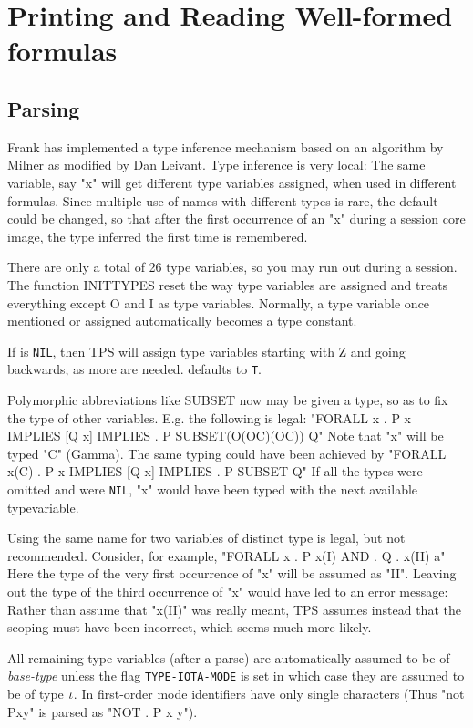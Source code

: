 \chapter{Printing and Reading Well-formed formulas}
\section{Parsing}

Frank has implemented a type inference mechanism based on an algorithm by
Milner as modified by Dan Leivant.
Type inference is very local: The same variable, say "x" will
get different type variables assigned, when used in different formulas.
Since multiple use of names with different types is rare, the default
could be changed, so that after the first occurrence of an "x" during
a session {core image}, the type inferred the first time is remembered.

There are only a total of 26 type variables, so you may run out during
a session.  The function INITTYPES reset the way type variables are
assigned and treats everything except O and I as type variables.
Normally, a type variable once mentioned or assigned automatically
becomes a type constant.

If  is {\tt NIL}, then 
TPS will assign type variables starting with Z and going backwards, as 
more are needed.  defaults to {\tt T}.

Polymorphic abbreviations like SUBSET now may be given a type, so as to fix
the type of other variables.  E.g. the following is legal:
   "FORALL x . P x IMPLIES [Q x] IMPLIES . P SUBSET(O(OC)(OC)) Q"
Note that "x" will be typed "C" (Gamma).  The same typing could have been
achieved by
   "FORALL x(C) . P x IMPLIES [Q x] IMPLIES . P SUBSET Q"
If all the types were omitted and  were {\tt NIL}, 
"x" would have been typed with the next available typevariable.

Using the same name for two variables of distinct type is legal, but not
recommended.  Consider, for example,
   "FORALL x . P x(I) AND . Q . x(II) a"
Here the type of the very first occurrence of "x" will be assumed as "II".
Leaving out the type of the third occurrence of "x" would have led to an
error message:  Rather than assume that "x(II)" was really meant, TPS
assumes instead that the scoping must have been incorrect, which seems much 
more likely.

All remaining type variables (after a parse) are automatically assumed
to be of {\it base-type} unless the flag {\tt TYPE-IOTA-MODE} is set in which
case they are assumed to be of type $\iota$. In first-order mode identifiers have
only single characters (Thus "not Pxy" is parsed as "NOT . P x y").

